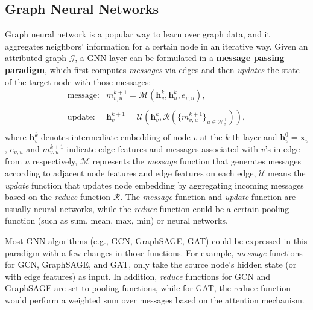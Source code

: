 \documentclass[conference]{IEEEtran}
\begin{document}
\subsection{Graph Neural Networks}
Graph neural network is a popular way to learn over graph data, and it aggregates neighbors' information for a certain node in an iterative way.
Given an attributed graph $\mathcal{G}$, a GNN layer can be formulated in a \textbf{message passing paradigm}\cite{b13,b15,b23}, which first computes \emph{messages} via edges and then \emph{updates} the state of the target node with those messages:
\begin{equation} \label{eq:mpgnn}
\begin{array}{cl}
\text{message:} & m_{v,u}^{k+1} = \mathcal{M}(\mathbf{h}_v^k, \mathbf{h}_u^k, e_{v,u}),\\
\\
\text{update:} & \mathbf{h}_v^{k+1}= \mathcal{U}(\mathbf{h}_v^k, \mathcal{R}(\{m_{v,u}^{k+1}\}_{u \in \mathcal{N}^+_v})),\\
\end{array}
\end{equation}
where $\mathbf{h}_v^{k}$ denotes intermediate 
embedding of node $v$ at the $k$-th layer and $\mathbf{h}_v^{0} = \mathbf{x}_v$,
 $e_{v,u}$  and $m_{v,u}^{k+1}$ indicate edge features and messages associated with $v$'s in-edge from $u$ respectively,
$\mathcal{M}$ represents the \emph{message} function that generates messages according to adjacent node features and edge features on each edge,
$\mathcal{U}$ means the \emph{update} function that updates node embedding by aggregating incoming messages based on the \emph{reduce} function $\mathcal{R}$.
The \emph{message} function and \emph{update} function are usually neural networks, while the \emph{reduce} function could be a certain pooling function (such as sum, mean, max, min) or neural networks.

Most GNN algorithms (e.g., GCN\cite{b1}, GraphSAGE\cite{b4}, GAT\cite{b3}) could be expressed in this paradigm with a few changes in those functions.
For example, \emph{message} functions for GCN, GraphSAGE, and GAT, only take the source node's hidden state (or with edge features) as input.
In addition, \emph{reduce} functions for GCN and GraphSAGE are set to pooling functions, while for GAT, the reduce function would perform a weighted sum over messages based on the attention mechanism.
\end{document}
